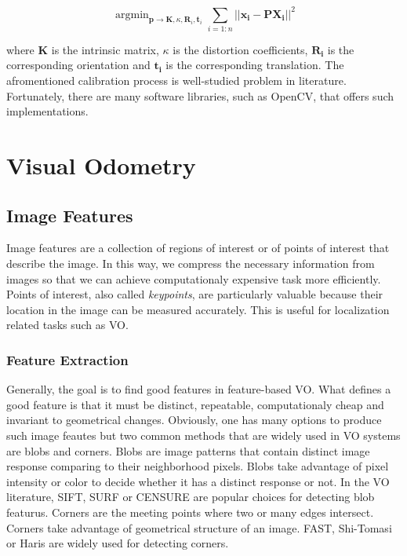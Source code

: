 \documentclass[a4paper]{report}
\numberwithin{figure}{section}
\newcommand{\argmin}{\mathop{\mathrm{argmin}}}
\begin{document}
\begin{equation}
  \argmin_{\mathbf{p} \rightarrow \mathbf{K}, \kappa, \mathbf{R}_i, \mathbf{t}_i}
  \sum_{i=1:n} || \mathbf{x_{i}} - 
  \mathbf{P} \mathbf{X_{i}} ||^2
\end{equation}\label{eq:proj_lsq}

where $\mathbf{K}$ is the intrinsic matrix, 
$\kappa$ is the distortion coefficients, 
$\mathbf{R_i}$ is the corresponding orientation and 
$\mathbf{t_i}$ is the corresponding translation.
The afromentioned calibration process is well-studied problem in literature. 
Fortunately, there are many software libraries, such as OpenCV, 
that offers such implementations.



\chapter{Visual Odometry} \label{cp_vo}

\section{Image Features} \label{sc_img_features}

Image features are a collection of regions of interest or of points of interest 
that describe the image. In this way, we compress the necessary information 
from images so that we can achieve computationaly expensive task more efficiently.
Points of interest, also called \textit{keypoints}, 
are particularly valuable because their location in the image can be 
measured accurately. This is useful for localization related tasks such as VO. 

\subsection{Feature Extraction} \label{sb_sc_feature_extraction}

Generally, the goal is to find good features in feature-based VO. 
What defines a good feature is that it must be distinct, 
repeatable, computationaly cheap and invariant to geometrical changes. 
Obviously, one has many options to produce such image 
feautes but two common methods that are widely used in VO systems are 
blobs and corners. 
Blobs are image patterns that contain distinct image response comparing to their 
neighborhood pixels. Blobs take advantage of pixel intensity or color to 
decide whether it has a distinct response or not.
In the VO literature, SIFT\cite{}, SURF\cite{} or CENSURE\cite{} are popular 
choices for detecting blob featurus.
Corners are the meeting points where two or many edges intersect. Corners 
take advantage of geometrical structure of an image. FAST\cite{}, Shi-Tomasi or 
Haris\cite{} are widely used for detecting corners.
\end{document}

